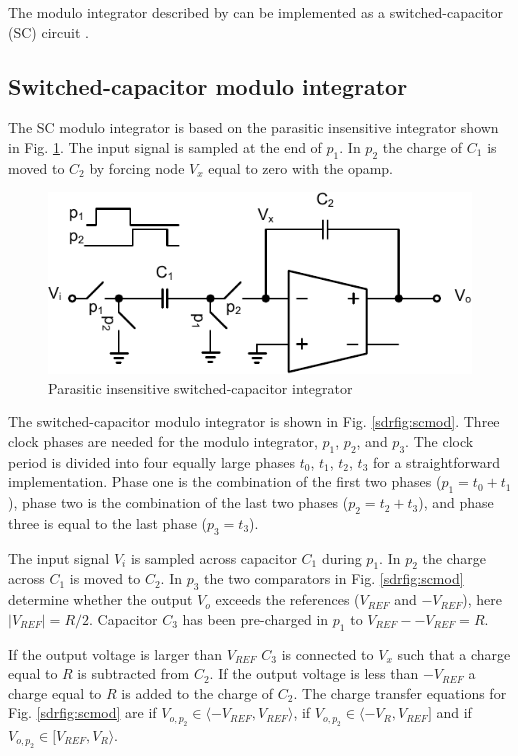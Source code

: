 The modulo integrator described by  can be implemented
as a switched-capacitor (SC) circuit \cite{wulff08a}. 

\subsection{Switched-capacitor modulo integrator}\label{sdrSscmod}
The SC modulo integrator is based on the
parasitic insensitive integrator shown in Fig. \ref{sdrfig:scint}. The
input signal is sampled at the end of $p_1$. In $p_2$ the charge of
$C_1$ is moved to $C_2$ by forcing node $V_x$ equal to zero
with the opamp.
\begin{figure}[htbp]
\centerline{ \includegraphics[width=\myfigwidth]{graphics/sc_int}}
  \caption{Parasitic insensitive switched-capacitor integrator}
  \label{sdrfig:scint}
\end{figure}
The switched-capacitor modulo integrator is shown in
Fig. \ref{sdrfig:scmod}. Three
clock phases are needed for the modulo integrator, $p_1$, $p_2$, and
$p_3$. The clock period is divided into four equally large phases
$t_0$, $t_1$, $t_2$, $t_3$ for a
straightforward implementation. Phase one is the combination of
the first two phases ($p_1 = t_0 + t_1$), phase two is the
combination of the last two phases ($p_2 = t_2 + t_3$), and phase three is
equal to the last phase ($p_3= t_3$). 

The input signal $V_{i}$ is
sampled across capacitor $C_1$ during $p_1$. In $p_2$ the charge
across $C_1$ is moved to $C_2$. In $p_3$ the two comparators in
Fig. \ref{sdrfig:scmod} determine whether the output $V_{o}$ exceeds
the references ($V_{REF}$ and $-V_{REF}$), here $|V_{REF}| =
R/2$. Capacitor $C_3$ has been pre-charged in $p_1$ to $V_{REF}
- - V_{REF} = R$. 

If the output voltage is larger than $V_{REF}$ $C_3$
is connected to $V_x$ such that a charge equal to $R$ is subtracted
from $C_2$. If the output voltage is
less than $-V_{REF}$ a charge equal to $R$ is added to the charge
of $C_2$. The charge transfer equations for Fig. \ref{sdrfig:scmod} are
 if $V_{o,p_2} \in \langle -V_{REF}, V_{REF} \rangle$,
  if $V_{o,p_2} \in \langle -V_R, V_{REF}]$ and 
if $V_{o,p_2} \in [ V_{REF}, V_R \rangle$.


